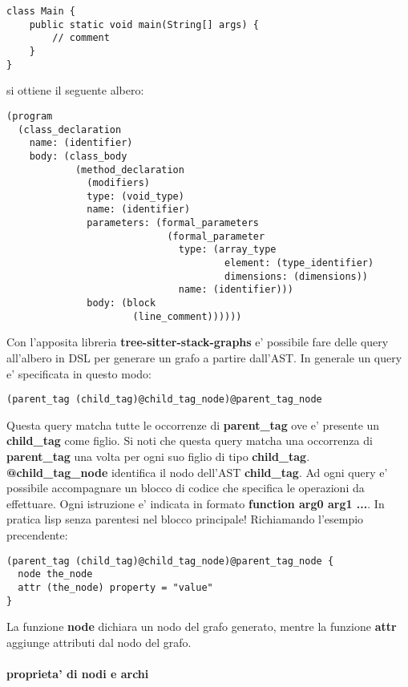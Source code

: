 \begin{verbatim}
class Main {
	public static void main(String[] args) {
    	// comment
    }
}
\end{verbatim}

si ottiene il seguente albero:

\begin{verbatim}
(program
  (class_declaration
    name: (identifier)
    body: (class_body
            (method_declaration
              (modifiers)
              type: (void_type)
              name: (identifier)
              parameters: (formal_parameters
                            (formal_parameter
                              type: (array_type
                                      element: (type_identifier)
                                      dimensions: (dimensions))
                              name: (identifier)))
              body: (block
                      (line_comment))))))
\end{verbatim}

Con l'apposita libreria \textbf{tree-sitter-stack-graphs} e' possibile fare delle query all'albero in DSL per generare un grafo a partire dall'AST.
In generale un query e' specificata in questo modo:

\begin{verbatim}
(parent_tag (child_tag)@child_tag_node)@parent_tag_node
\end{verbatim}

Questa query matcha tutte le occorrenze di \textbf{parent\_tag} ove e' presente un \textbf{child\_tag} come figlio. Si noti che questa query matcha una occorrenza di \textbf{parent\_tag} una volta per ogni suo figlio di tipo \textbf{child\_tag}. \textbf{@child\_tag\_node} identifica il nodo dell'AST \textbf{child\_tag}.
Ad ogni query e' possibile accompagnare un blocco di codice che specifica le operazioni da effettuare. Ogni istruzione e' indicata in formato \textbf{function arg0 arg1 ...}. In pratica lisp senza parentesi nel blocco principale! Richiamando l'esempio precendente:

\begin{verbatim}
(parent_tag (child_tag)@child_tag_node)@parent_tag_node {
  node the_node
  attr (the_node) property = "value"
}
\end{verbatim}

La funzione \textbf{node} dichiara un nodo del grafo generato, mentre la funzione \textbf{attr} aggiunge attributi dal nodo del grafo.

\paragraph{proprieta' di nodi e archi}

